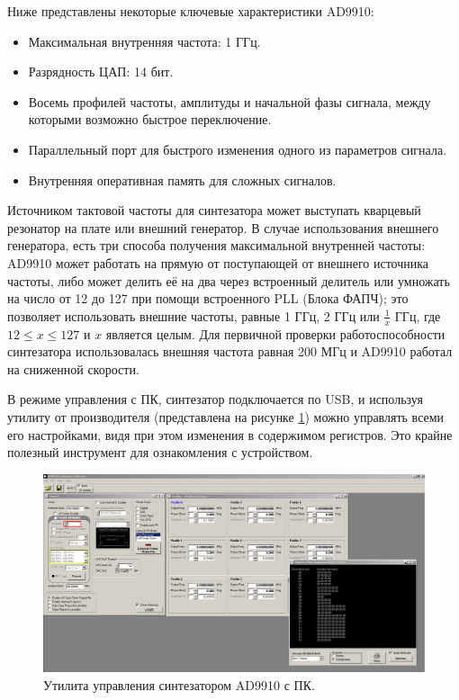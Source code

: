 \documentclass[rusmathsym, eqnumwithinsec, amspack, hyperref]{bomgost}
\begin{document}
Ниже представлены некоторые ключевые характеристики AD9910:

\begin{itemize}
	\item Максимальная внутренняя частота: 1 ГГц.
	\item Разрядность ЦАП: 14 бит.
	\item Восемь профилей частоты, амплитуды и начальной фазы сигнала, между которыми возможно быстрое переключение.
	\item Параллельный порт для быстрого изменения одного из параметров сигнала.
	\item Внутренняя оперативная память для сложных сигналов.
\end{itemize}

Источником тактовой частоты для синтезатора может выступать кварцевый резонатор на плате или внешний генератор. В случае использования внешнего генератора, есть три способа получения максимальной внутренней частоты: AD9910 может работать на прямую от поступающей от внешнего источника частоты, либо может делить её на два через встроенный делитель или умножать на число от 12 до 127 при помощи встроенного PLL (Блока ФАПЧ); это позволяет использовать внешние частоты, равные 1 ГГц, 2 ГГц или $\frac{1}{x}$ ГГц, где $12 \leq x \leq 127$ и $x$ является целым. Для первичной проверки работоспособности синтезатора использовалась внешняя частота равная 200 МГц и AD9910 работал на сниженной скорости.

В режиме управления с ПК, синтезатор подключается по USB, и используя утилиту от производителя (представлена на рисунке \ref{fig:ad9910_evaluation_software}) можно управлять всеми его настройками, видя при этом изменения в содержимом регистров. Это крайне полезный инструмент для ознакомления с устройством.

\begin{gostfigure}
\begin{figure}[H]
\centering
\includegraphics[scale=.25]{data/ad9910_evaluation_software.png}
\caption{Утилита управления синтезатором AD9910 с ПК.}
\label{fig:ad9910_evaluation_software}
\end{figure}
\end{gostfigure}
\end{document}
